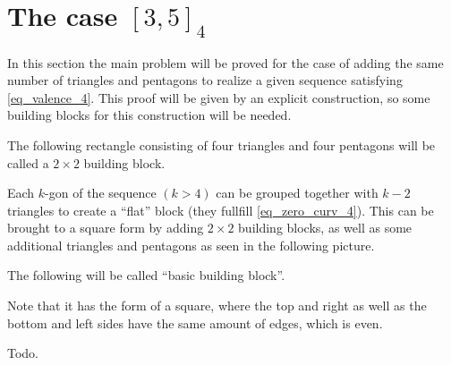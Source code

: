 \section{The case $[3, 5]_4$}
In this section the main problem will be proved for the case of adding the same number of triangles and pentagons to realize a given sequence satisfying \autoref{eq_valence_4}. This proof will be given by an explicit construction, so some building blocks for this construction will be needed.
\begin{definition}
  The following rectangle consisting of four triangles and four pentagons will be called a $2 \times 2$ building block.
  \begin{figure}[htpp]
    \centering
  \end{figure}
\end{definition}

Each $k$-gon of the sequence $(k > 4)$ can be grouped together with $k-2$ triangles to create a ``flat'' block (they fullfill \autoref{eq_zero_curv_4}). This can be brought to a square form by adding $2 \times 2$ building blocks, as well as some additional triangles and pentagons as seen in the following picture.
\begin{definition} The following will be called ``basic building block''.
  \begin{figure}[htpp]
    \centering
  \end{figure}
  Note that it has the form of a square, where the top and right as well as the bottom and left sides have the same amount of edges, which is even.
\end{definition}
Todo.

